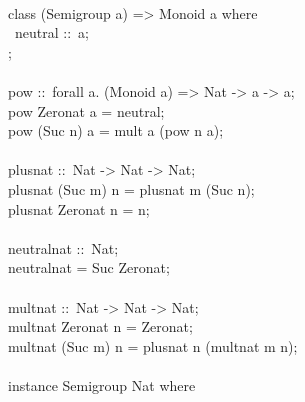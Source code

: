 \begin{isabellebody}
\begin{isamarkuptext}
\hspace*{0pt}\\
\hspace*{0pt}class (Semigroup a) => Monoid a where {}\\
\hspace*{0pt} ~neutral ::~a;\\
\hspace*{0pt}{\char125};\\
\hspace*{0pt}\\
\hspace*{0pt}pow ::~forall a. (Monoid a) => Nat -> a -> a;\\
\hspace*{0pt}pow Zero{}nat a = neutral;\\
\hspace*{0pt}pow (Suc n) a = mult a (pow n a);\\
\hspace*{0pt}\\
\hspace*{0pt}plus{}nat ::~Nat -> Nat -> Nat;\\
\hspace*{0pt}plus{}nat (Suc m) n = plus{}nat m (Suc n);\\
\hspace*{0pt}plus{}nat Zero{}nat n = n;\\
\hspace*{0pt}\\
\hspace*{0pt}neutral{}nat ::~Nat;\\
\hspace*{0pt}neutral{}nat = Suc Zero{}nat;\\
\hspace*{0pt}\\
\hspace*{0pt}mult{}nat ::~Nat -> Nat -> Nat;\\
\hspace*{0pt}mult{}nat Zero{}nat n = Zero{}nat;\\
\hspace*{0pt}mult{}nat (Suc m) n = plus{}nat n (mult{}nat m n);\\
\hspace*{0pt}\\
\hspace*{0pt}instance Semigroup Nat where {}\\

\end{isamarkuptext}
\end{isabellebody}
